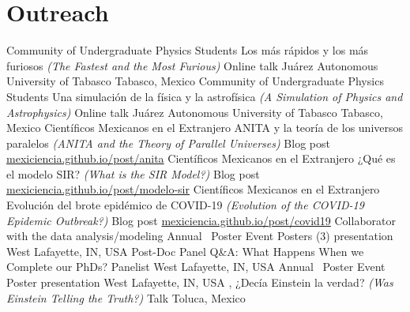 \section{Outreach}

%
{Community of Undergraduate Physics Students}%
{Los más rápidos y los más furiosos \textnormal{\textit{(The Fastest and the Most Furious)}}}%
{Online talk}%
{Juárez Autonomous University of Tabasco}%
{Tabasco, Mexico}
%
{Community of Undergraduate Physics Students}%
{Una simulación de la física y la astrofísica \textnormal{\textit{(A Simulation of Physics and Astrophysics)}}}%
{Online talk}%
{Juárez Autonomous University of Tabasco}%
{Tabasco, Mexico}
%
{Científicos Mexicanos en el Extranjero}%
{ANITA y la teoría de los universos paralelos \textnormal{\textit{(ANITA and the Theory of Parallel Universes)}}}%
{Blog post}%
{\href{https://mexiciencia.github.io/post/anita/}{mexiciencia.github.io/post/anita}}%
{}
%
{Científicos Mexicanos en el Extranjero}%
{¿Qué es el modelo SIR? \textnormal{\textit{(What is the SIR Model?)}}}%
{Blog post}%
{\href{https://mexiciencia.github.io/post/modelo-sir/}{mexiciencia.github.io/post/modelo-sir}}%
{}
%
{Científicos Mexicanos en el Extranjero}%
{Evolución del brote epidémico de COVID-19 \textnormal{\textit{(Evolution of the COVID-19 Epidemic Outbreak?)}}}%
{Blog post}%
{\href{https://mexiciencia.github.io/post/covid19/}{mexiciencia.github.io/post/covid19}}%
{Collaborator with the data analysis/modeling}
%
{\DPA}%
{Annual \DPA\ Poster Event}%
{Posters (3) presentation}%
{\Purdue}%
{West Lafayette, IN, USA}
%
{\DPA}%
{Post-Doc Panel Q\&A: What Happens When we Complete our PhDs?}%
{Panelist}%
{\Purdue}%
{West Lafayette, IN, USA}
%
{\DPA}%
{Annual \DPA\ Poster Event}%
{Poster presentation}%
{\Purdue}%
{West Lafayette, IN, USA}
%
{\FCes, \UAEMes}%
{¿Decía Einstein la verdad? \textnormal{\textit{(Was Einstein Telling the Truth?)}}}%
{Talk}%
{}%
{Toluca, Mexico}

